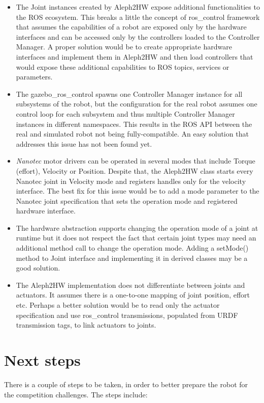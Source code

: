 \documentclass[english,inz,shortabstract]{iithesis}
\begin{document}
\begin{itemize}
	\item The \textsf{Joint} instances created by \textsf{Aleph2HW} expose additional functionalities to the ROS ecosystem. This breaks a little the concept of \textsf{ros\_control} framework that assumes the capabilities of a robot are exposed only by the hardware interfaces and can be accessed only by the controllers loaded to the Controller Manager. A proper solution would be to create appropriate hardware interfaces and implement them in \textsf{Aleph2HW} and then load controllers that would expose these additional capabilities to ROS topics, services or parameters.  
	\item The \textsf{gazebo\_ros\_control} spawns one Controller Manager instance for all subsystems of the robot, but the configuration for the real robot assumes one control loop for each subsystem and thus multiple Controller Manager instances in different namespaces. This results in the ROS API between the real and simulated robot not being fully-compatible. An easy solution that addresses this issue has not been found yet.
	\item \textit{Nanotec} motor drivers can be operated in several modes that include Torque (effort), Velocity or Position. Despite that, the \textsf{Aleph2HW} class starts every \textsf{Nanotec} joint in Velocity mode and registers handles only for the velocity interface. The best fix for this issue would be to add a \textsf{mode} parameter to the \textsf{Nanotec} joint specification that sets the operation mode and registered hardware interface.
	\item The hardware abstraction supports changing the operation mode of a joint at runtime but it does not respect the fact that certain joint types may need an additional method call to change the operation mode. Adding a \textsf{setMode()} method to \textsf{Joint} interface and implementing it in derived classes may be a good solution.
	\item The \textsf{Aleph2HW} implementation does not differentiate between joints and actuators. It assumes there is a one-to-one mapping of joint position, effort etc. Perhaps a better solution would be to read only the actuator specification and use \textsf{ros\_control} transmissions, populated from URDF \textsf{transmission} tags, to link actuators to joints.
\end{itemize}

\section{Next steps}
There is a couple of steps to be taken, in order to better prepare the robot for the competition challenges. The steps include:
\end{document}
